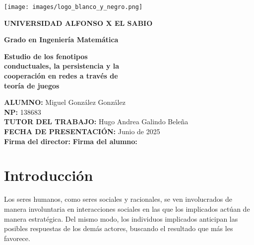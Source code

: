 \documentclass[a4paper,12pt]{report}
\begin{document}
\begin{titlepage}
    \thispagestyle{empty}
    \begin{center}
        \vspace*{-2.5cm}
        \texttt{[image: images/logo\_blanco\_y\_negro.png]}

        \vspace{1cm}
        {\bfseries\Large UNIVERSIDAD ALFONSO X EL SABIO}

        \vspace{1.5cm}
        {\large \textbf{Grado en Ingeniería Matemática}}

        \vspace{2.5cm}
        {\LARGE \textbf{
        Estudio de los fenotipos \\[0.3cm]
        conductuales, la persistencia y la\\[0.3cm]
        cooperación en redes a través de\\[0.3cm]
        teoría de juegos
        }} \\[1.3cm]
    \end{center}    
    \vspace{2.5cm}
    {\large \textbf{ALUMNO:} Miguel González González} \\[0.5cm]
    {\large \textbf{NP:} 138683} \\[0.5cm]
    {\large \textbf{TUTOR DEL TRABAJO:} Hugo Andrea Galindo Beleña} \\[0.5cm]        
    {\large \textbf{FECHA DE PRESENTACIÓN:} Junio de 2025} \\[0.5cm]        
    \textbf{Firma del director:}
    \hfill
    \textbf{Firma del alumno:}
\end{titlepage}


\newpage
\tableofcontents %

\newpage


\chapter{Introducción}

Los seres humanos, como seres sociales y racionales, se ven involucrados de manera involuntaria en interacciones sociales en las que los implicados actúan de manera estratégica. Del mismo modo, los individuos implicados anticipan las posibles respuestas de los demás actores, buscando el resultado que más les favorece.
\end{document}
